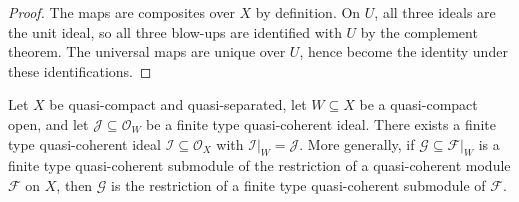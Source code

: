 \begin{proof}
  The maps are composites over $X$ by definition.  On $U$, all three ideals
  are the unit ideal, so all three blow-ups are identified with $U$ by the
  complement theorem.  The universal maps are unique over $U$, hence become
  the identity under these identifications.
\end{proof}


\begin{lemma}
  \label{lemma:nagata-finite-type-ideal-extension-exists}

  Let $X$ be quasi-compact and quasi-separated, let $W\subseteq X$ be a
  quasi-compact open, and let
  $\mathcal J\subseteq\mathcal O_W$ be a finite type quasi-coherent ideal.
  There exists a finite type quasi-coherent ideal
  $\mathcal I\subseteq\mathcal O_X$ with
  $\mathcal I|_W=\mathcal J$.
  More generally, if $\mathcal G\subseteq\mathcal F|_W$ is a finite type
  quasi-coherent submodule of the restriction of a quasi-coherent module
  $\mathcal F$ on $X$, then $\mathcal G$ is the restriction of a finite type
  quasi-coherent submodule of $\mathcal F$.
\end{lemma}


